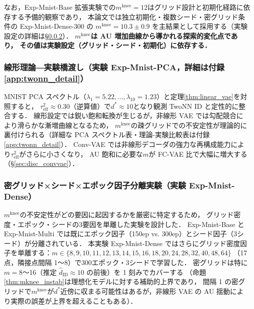 \documentclass[11pt,a4paper]{jsarticle}
\newcommand{\mknee}{m^{\mathrm{knee}}}
\begin{document}
なお，Exp-Mnist-Base 拡張実験での$\mknee = 12$はグリッド設計と初期化経路に依存する予備的観察であり，
本論文では独立初期化・複数シード・密グリッド条件の Exp-Mnist-Dense-300 の
$\mknee = 10.3 \pm 0.9$ を主結果として採用する（実験設定の詳細は§\ref{sec:exp_el}）．
\textbf{$\mknee$は AU 増加曲線から導かれる探索的変化点であり，
その値は実験設定（グリッド・シード・初期化）に依存する．}

\subsubsection{線形理論―実験橋渡し（実験 Exp-Mnist-PCA，詳細は付録\ref{app:twonn_detail}）}\label{sec:exp_em}

MNIST PCA スペクトル（$\lambda_1=5.22, \ldots, \lambda_{10}=1.23$）と定理\ref{thm:linear_vae}を対照すると，
$\tau^2_\mathrm{eff} \approx 0.30$（逆算値）で$d^* \approx 10$となり観測 TwoNN ID と定性的に整合する．
線形設定では鋭い飽和転換が生じるが，非線形 VAE では勾配競合により滑らかな漸増曲線となるため，
$\mknee$の疎グリッドでの不安定性が理論的に裏付けられる（詳細な PCA スペクトル表・理論-実験比較表は付録\ref{app:twonn_detail}）．
Conv-VAE では非線形デコーダの強力な再構成能力により$\tau^2_\mathrm{eff}$がさらに小さくなり，
AU 飽和に必要な$m$が FC-VAE 比で大幅に増大する（§\ref{sec:disc_convvae}）．

\subsubsection{密グリッド×シード×エポック因子分離実験（実験 Exp-Mnist-Dense）}\label{sec:exp_el}

$\mknee$の不安定性がどの要因に起因するかを厳密に特定するため，
グリッド密度・エポック・シードの3要因を単離した実験を設計した．
Exp-Mnist-Base と Exp-Mnist-Multi では既にエポック因子（150ep vs. 300ep）とシード因子（3シード）が分離されている．
本実験 Exp-Mnist-Dense ではさらにグリッド密度因子を単離する：$m \in \{8,9,10,11,12,13,14,15,16,18,20,24,28,32,40,48,64\}$
（17点，隣接点間隔 1〜8）で300エポック・3シードで学習した．
密グリッドは特に$m = 8$〜16（推定 $\hat{d}_\mathrm{ID} \approx 10$ の前後）を 1 刻みでカバーする
（命題\ref{thm:mknee_instab}は理想化モデルに対する補助的上界であり，
間隔 1 の密グリッドで$\mknee$が$d^*$近傍に収まる可能性はあるが，非線形 VAE の AU 揺動により実際の誤差が上界を超えることもある）．
\end{document}
